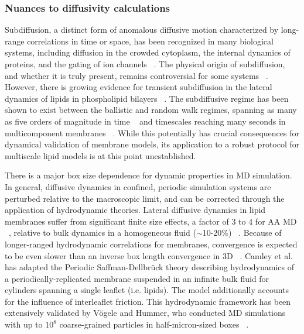 \documentclass[9pt,bestpractices,pubversion]{livecoms}
\begin{document}
\subsubsection{Nuances to diffusivity calculations}
\label{subsubsec:dynamicalnuances}
Subdiffusion, a distinct form of anomalous diffusive motion characterized by long-range correlations in time or space, has been recognized in many biological systems, including diffusion in the crowded cytoplasm, the internal dynamics of proteins, and the gating of ion channels  ~\cite{Nagle1992,Weiss2004,Kou2004,Goychuk2004}.
The physical origin of subdiffusion, and whether it is truly present, remains controversial for some systems  ~\cite{Saxton2012}.
However, there is growing evidence for transient subdiffusion in the lateral dynamics of lipids in phospholipid bilayers ~\cite{Munguira2016}.
The subdiffusive regime has been shown to exist between the ballistic and random walk regimes, spanning as many as five orders of magnitude in time ~\cite{Flenner2009a} and timescales reaching many seconds in multicomponent membranes ~\cite{Munguira2016}.
While this potentially has crucial consequences for dynamical validation of membrane models, its application to a robust protocol for multiscale lipid models is at this point unestablished.

There is a major box size dependence for dynamic properties in MD simulation.
In general, diffusive dynamics in confined, periodic simulation systems are perturbed relative to the macroscopic limit, and can be corrected through the application of hydrodynamic theories.
Lateral diffusive dynamics in lipid membranes suffer from significant finite size effects, a factor of 3 to 4 for AA MD ~\cite{Venable2017,Klauda2006b}, relative to bulk dynamics in a homogeneous fluid ($\sim$10-20\%)  ~\cite{Yeh2004c}.
Because of longer-ranged hydrodynamic correlations for membranes, convergence is expected to be even slower than an inverse box length convergence in 3D ~\cite{Camley2013a}.
Camley et al. has adapted the Periodic Saffman-Dellbr\"uck theory describing hydrodynamics of a periodically-replicated membrane suspended in an infinite bulk fluid for cylinders spanning a single leaflet (i.e. lipids).
The model additionally accounts for the influence of interleaflet friction.
This hydrodynamic framework has been extensively validated by V\"ogele and Hummer, who conducted MD simulations with up to $10^8$ coarse-grained particles in half-micron-sized boxes ~\cite{Vogele2018}.
\end{document}
